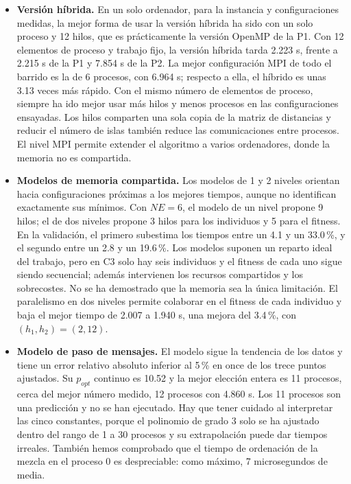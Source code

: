 \documentclass[12pt]{article}
\begin{document}
\begin{enumerate}
\begin{itemize}
    \item \textbf{Versión híbrida.} En un solo ordenador, para la instancia y configuraciones medidas, la mejor forma de usar la versión híbrida ha sido con un solo proceso y 12 hilos, que es prácticamente la versión OpenMP de la P1. Con 12 elementos de proceso y trabajo fijo, la versión híbrida tarda 2.223 s, frente a 2.215 s de la P1 y 7.854 s de la P2. La mejor configuración MPI de todo el barrido es la de 6 procesos, con 6.964 s; respecto a ella, el híbrido es unas 3.13 veces más rápido. Con el mismo número de elementos de proceso, siempre ha ido mejor usar más hilos y menos procesos en las configuraciones ensayadas. Los hilos comparten una sola copia de la matriz de distancias y reducir el número de islas también reduce las comunicaciones entre procesos. El nivel MPI permite extender el algoritmo a varios ordenadores, donde la memoria no es compartida.
    \item \textbf{Modelos de memoria compartida.} Los modelos de 1 y 2 niveles orientan hacia configuraciones próximas a los mejores tiempos, aunque no identifican exactamente sus mínimos. Con $NE = 6$, el modelo de un nivel propone 9 hilos; el de dos niveles propone 3 hilos para los individuos y 5 para el fitness. En la validación, el primero subestima los tiempos entre un 4.1 y un 33.0\,\%, y el segundo entre un 2.8 y un 19.6\,\%. Los modelos suponen un reparto ideal del trabajo, pero en C3 solo hay seis individuos y el fitness de cada uno sigue siendo secuencial; además intervienen los recursos compartidos y los sobrecostes. No se ha demostrado que la memoria sea la única limitación. El paralelismo en dos niveles permite colaborar en el fitness de cada individuo y baja el mejor tiempo de 2.007 a 1.940 s, una mejora del 3.4\,\%, con $(h_1,h_2)=(2,12)$.
    \item \textbf{Modelo de paso de mensajes.} El modelo sigue la tendencia de los datos y tiene un error relativo absoluto inferior al 5\,\% en once de los trece puntos ajustados. Su $p_{opt}$ continuo es 10.52 y la mejor elección entera es 11 procesos, cerca del mejor número medido, 12 procesos con 4.860 s. Los 11 procesos son una predicción y no se han ejecutado. Hay que tener cuidado al interpretar las cinco constantes, porque el polinomio de grado 3 solo se ha ajustado dentro del rango de 1 a 30 procesos y su extrapolación puede dar tiempos irreales. También hemos comprobado que el tiempo de ordenación de la mezcla en el proceso 0 es despreciable: como máximo, 7 microsegundos de media.

\end{itemize}
\end{enumerate}
\end{document}
